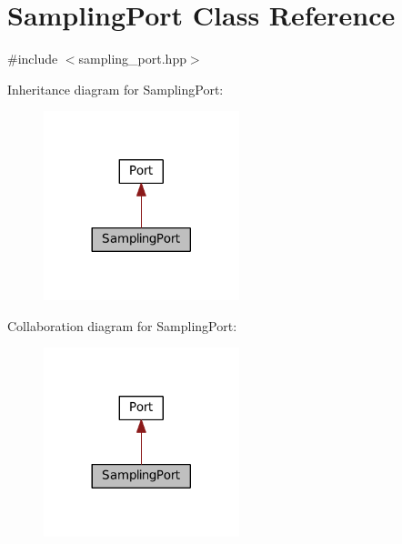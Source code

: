\hypertarget{classSamplingPort}{}\section{Sampling\+Port Class Reference}
\label{classSamplingPort}


{\ttfamily \#include $<$sampling\+\_\+port.\+hpp$>$}



Inheritance diagram for Sampling\+Port\+:\nopagebreak
\begin{figure}[H]
\begin{center}
\leavevmode
\includegraphics[width=161pt]{classSamplingPort__inherit__graph}
\end{center}
\end{figure}


Collaboration diagram for Sampling\+Port\+:\nopagebreak
\begin{figure}[H]
\begin{center}
\leavevmode
\includegraphics[width=161pt]{classSamplingPort__coll__graph}
\end{center}
\end{figure}

